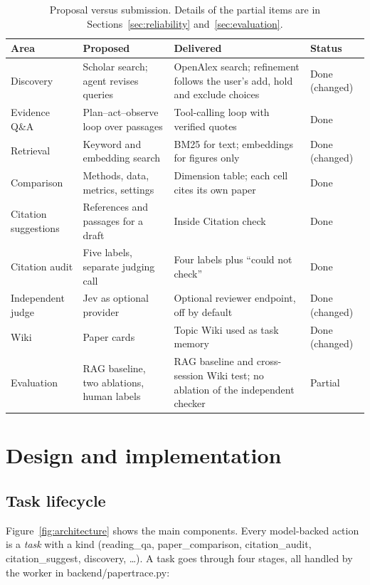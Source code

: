 \documentclass{article}
\newcommand{\code}[1]{{\ttfamily\small\hyphenchar\font=-1\relax #1}}
\begin{document}
\begin{table}[!hbp]
  \caption{Proposal versus submission. Details of the partial items are in
  Sections~\ref{sec:reliability} and~\ref{sec:evaluation}.}
  \label{tab:continuity}
  \small
  \begin{tabularx}{\linewidth}{@{}P{2.4cm}YYl@{}}
    \toprule
    Area & Proposed & Delivered & Status \\
    \midrule
    Discovery & Scholar search; agent revises queries & OpenAlex search; refinement follows the user's add, hold and exclude choices & Done (changed) \\ \addlinespace[4pt]
    Evidence Q\&A & Plan--act--observe loop over passages & Tool-calling loop with verified quotes & Done \\ \addlinespace[4pt]
    Retrieval & Keyword and embedding search & BM25 for text; embeddings for figures only & Done (changed) \\ \addlinespace[4pt]
    Comparison & Methods, data, metrics, settings & Dimension table; each cell cites its own paper & Done \\ \addlinespace[4pt]
    Citation suggestions & References and passages for a draft & Inside Citation check & Done \\ \addlinespace[4pt]
    Citation audit & Five labels, separate judging call & Four labels plus ``could not check'' & Done \\ \addlinespace[4pt]
    Independent judge & Jev as optional provider & Optional reviewer endpoint, off by default & Done (changed) \\ \addlinespace[4pt]
    Wiki & Paper cards & Topic Wiki used as task memory & Done (changed) \\ \addlinespace[4pt]
    Evaluation & RAG baseline, two ablations, human labels & RAG baseline and cross-session Wiki test; no ablation of the independent checker & Partial \\
    \bottomrule
  \end{tabularx}
\end{table}

\section{Design and implementation}
\label{sec:design}

\subsection{Task lifecycle}
Figure~\ref{fig:architecture} shows the main components. Every model-backed action is a \emph{task}
with a kind (\code{reading\_qa}, \code{paper\_comparison}, \code{citation\_audit},
\code{citation\_suggest}, \code{discovery}, \ldots). A task goes through four stages, all handled by
the worker in \code{backend/papertrace.py}:
\end{document}
